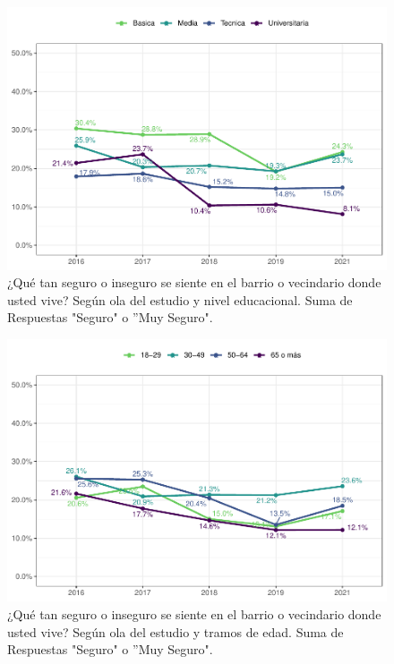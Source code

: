 \documentclass[
  12pt,
  openany]{book}
\begin{document}
\begin{figure}

{\centering \includegraphics{reporte-elsoc_files/figure-latex/seguri-educ-1} 

}

\caption{¿Qué tan seguro o inseguro se siente en el barrio o vecindario donde usted vive? Según ola del estudio y nivel educacional. Suma de Respuestas "Seguro" o ”Muy Seguro".}\label{fig:seguri-educ}
\end{figure}

\begin{figure}

{\centering \includegraphics{reporte-elsoc_files/figure-latex/seguri-edad-1} 

}

\caption{¿Qué tan seguro o inseguro se siente en el barrio o vecindario donde usted vive? Según ola del estudio y tramos de edad. Suma de Respuestas "Seguro" o ”Muy Seguro".}\label{fig:seguri-edad}
\end{figure}
\end{document}
